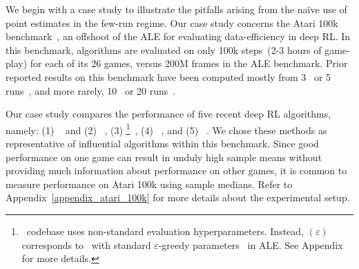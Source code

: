 We begin with a case study to illustrate the pitfalls arising from the na\"ive use of point estimates in the few-run regime. Our case study concerns the Atari 100k benchmark~\citep{kaiser2019model}, an offshoot of the ALE for evaluating data-efficiency in deep RL. In this benchmark, algorithms are evaluated on only 100k steps~(2-3 hours of game-play) for each of its 26 games, versus 200M frames in the ALE benchmark. %
Prior reported results on this benchmark have been computed mostly from 3~\citep{kulkarni2019unsupervised, Hansen2020Fast, lee2020sunrise, maulana2021ensemble, saphal2021seerl, pmlr-v139-seo21a} or 5 runs~\citep{kaiser2019model, van2019use, yarats2021image, kielak2020recent, robine2020discrete, zhu2020masked, liu2021returnbased, kozakowski2021q, pmlr-v139-liu21b}, and more rarely, 10~\citep{schwarzer2021dataefficient, hao2021behavior} or 20 runs~\citep{laskin2020curl}. 





Our case study compares the performance of five recent deep RL algorithms, 
namely: (1) \der~\citep{van2019use} and (2) \otr~\citep{kielak2020recent}, (3) \drq\footnote{\drq\ codebase uses non-standard evaluation hyperparameters. Instead, \drq$(\varepsilon)$ corresponds to \drq\ with standard $\varepsilon$-greedy parameters~\citep[][Table 1]{castro2018dopamine} in ALE. See Appendix for more details.
}~\citep{yarats2021image}, (4) \curl~\citep{laskin2020curl}, and (5) \spr~\citep{schwarzer2021dataefficient}. We chose these methods as representative of influential algorithms within this benchmark. %
Since good performance on one game can result in unduly high sample means without providing much information about performance on other games, 
it is common to measure performance on Atari 100k using sample medians. Refer to Appendix~\ref{appendix_atari_100k} for more details about the experimental setup.


